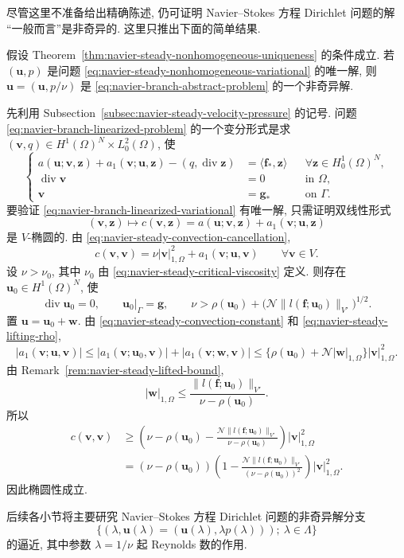 尽管这里不准备给出精确陈述, 仍可证明 Navier--Stokes 方程 Dirichlet 问题的解
``一般而言''是非奇异的. 这里只推出下面的简单结果.

\setcounter{statement}{1}
\begin{Lemma}\label{lem:navier-branch-small-data-nonsingular}
假设 Theorem~\ref{thm:navier-steady-nonhomogeneous-uniqueness} 的条件成立.
若 $(\mathbf u,p)$ 是问题
\eqref{eq:navier-steady-nonhomogeneous-variational} 的唯一解, 则
$\boldsymbol u=(\mathbf u,p/\nu)$ 是
\eqref{eq:navier-branch-abstract-problem} 的一个非奇异解.
\end{Lemma}
\begin{Proof}
先利用 Subsection~\ref{subsec:navier-steady-velocity-pressure} 的记号.
问题 \eqref{eq:navier-branch-linearized-problem} 的一个变分形式是求
$(\mathbf v,q)\in H^1(\Omega)^N\times L_0^2(\Omega)$, 使
\begin{equation}\label{eq:navier-branch-linearized-variational}
\left\{
\begin{aligned}
a(\mathbf u;\mathbf v,\mathbf z)
+a_1(\mathbf v;\mathbf u,\mathbf z)
-(q,\operatorname{div}\mathbf z)
&=\langle\mathbf f_*,\mathbf z\rangle
&&\forall\mathbf z\in H_0^1(\Omega)^N,\\
\operatorname{div}\mathbf v&=0&&\text{in }\Omega,\\
\mathbf v&=\mathbf g_*&&\text{on }\Gamma.
\end{aligned}
\right.
\end{equation}
要验证 \eqref{eq:navier-branch-linearized-variational} 有唯一解, 只需证明双线性形式
\[
(\mathbf v,\mathbf z)\longmapsto
c(\mathbf v,\mathbf z)
=a(\mathbf u;\mathbf v,\mathbf z)
+a_1(\mathbf v;\mathbf u,\mathbf z)
\]
是 $V$-椭圆的. 由 \eqref{eq:navier-steady-convection-cancellation},
\[
c(\mathbf v,\mathbf v)
=\nu|\mathbf v|_{1,\Omega}^2
+a_1(\mathbf v;\mathbf u,\mathbf v)
\qquad\forall\mathbf v\in V.
\]
设 $\nu>\nu_0$, 其中 $\nu_0$ 由
\eqref{eq:navier-steady-critical-viscosity} 定义. 则存在
$\mathbf u_0\in H^1(\Omega)^N$, 使
\[
\operatorname{div}\mathbf u_0=0,
\qquad \mathbf u_0|_\Gamma=\mathbf g,
\qquad
\nu>\rho(\mathbf u_0)
+\bigl(\mathcal N\|l(\mathbf f;\mathbf u_0)\|_{V'}\bigr)^{1/2}.
\]
置 $\mathbf u=\mathbf u_0+\mathbf w$. 由
\eqref{eq:navier-steady-convection-constant} 和
\eqref{eq:navier-steady-lifting-rho},
\[
|a_1(\mathbf v;\mathbf u,\mathbf v)|
\leq|a_1(\mathbf v;\mathbf u_0,\mathbf v)|
+|a_1(\mathbf v;\mathbf w,\mathbf v)|
\leq\{\rho(\mathbf u_0)+\mathcal N|\mathbf w|_{1,\Omega}\}
|\mathbf v|_{1,\Omega}^2.
\]
由 Remark~\ref{rem:navier-steady-lifted-bound},
\[
|\mathbf w|_{1,\Omega}
\leq\frac{\|l(\mathbf f;\mathbf u_0)\|_{V'}}
{\nu-\rho(\mathbf u_0)}.
\]
所以
\[
\begin{aligned}
c(\mathbf v,\mathbf v)
&\geq\left(\nu-\rho(\mathbf u_0)
-\frac{\mathcal N\|l(\mathbf f;\mathbf u_0)\|_{V'}}
{\nu-\rho(\mathbf u_0)}\right)|\mathbf v|_{1,\Omega}^2\\
&=(\nu-\rho(\mathbf u_0))
\left(1-
\frac{\mathcal N\|l(\mathbf f;\mathbf u_0)\|_{V'}}
{(\nu-\rho(\mathbf u_0))^2}\right)|\mathbf v|_{1,\Omega}^2.
\end{aligned}
\]
因此椭圆性成立.
\end{Proof}

后续各小节将主要研究 Navier--Stokes 方程 Dirichlet 问题的非奇异解分支
\[
\{(\lambda,\boldsymbol u(\lambda)
=(\mathbf u(\lambda),\lambda p(\lambda)));
\ \lambda\in\Lambda\}
\]
的逼近, 其中参数 $\lambda=1/\nu$ 起 Reynolds 数的作用.

